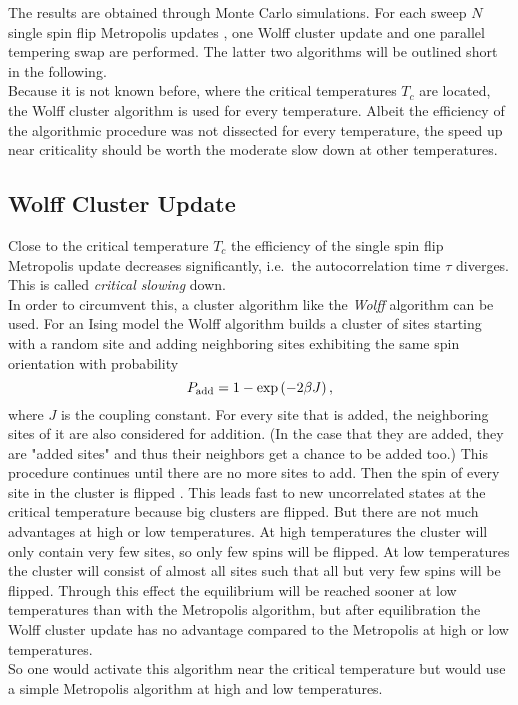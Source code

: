 The results are obtained through Monte Carlo simulations.
For each sweep \(N\) single spin flip Metropolis updates \cite{Metropolis1953}, one
Wolff cluster update \cite{Wolff1989} and one parallel tempering swap \cite{ParallelTempering1986} are
performed. The latter two algorithms will be outlined short in the following.\\
Because it is not known before, where the critical temperatures
\(T_c\) are located, the Wolff cluster algorithm is used for
every temperature. Albeit the efficiency of the algorithmic procedure
was not dissected for every temperature, the speed up
near criticality should be worth the moderate slow down at other temperatures.

\subsection{Wolff Cluster Update}
\label{sssec:wolff}
    Close to the critical temperature \(T_c\) the efficiency of the
    single spin flip Metropolis update decreases significantly, i.e.\ the
    autocorrelation time \(\tau\) diverges.
    This is called \emph{critical slowing} down.\\
    In order to circumvent this, a cluster algorithm like the \emph{Wolff}
    algorithm \cite{Wolff1989} can be used.
    For an Ising model the Wolff algorithm builds a cluster of sites
    starting with a random site and adding neighboring sites exhibiting the
    same spin orientation with probability
    \begin{equation}
        P_{\mathrm{add}} = 1-\exp\left(-2\beta J\right),
        \label{eq:wolffAdd}
    \end{equation}
    where \(J\) is the coupling constant.
    For every site that is added, the neighboring sites of it are
    also considered for addition. (In the case that they are added,
    they are "added sites" and thus their neighbors get a chance to be
    added too.)
    This procedure continues until there are no more sites to add.
    Then the spin of every site in the cluster is flipped
    \cite[p. 91ff]{NewmanBarkema1999} \cite[p. 151f]{Katzgraber2011}.
    This leads fast to new uncorrelated states at the critical
    temperature because big clusters are flipped. But there are not
    much advantages at high or low temperatures. At high temperatures the cluster
    will only contain very few sites, so only few spins will be flipped.
    At low temperatures the cluster will consist of almost all sites
    such that all but very few spins will be flipped. Through this effect the equilibrium
    will be reached sooner at low temperatures than with the Metropolis
    algorithm, but after equilibration the Wolff cluster update has no
    advantage compared to the Metropolis at high or low temperatures.\\
    So one would activate this algorithm near the critical temperature
    but would use a simple Metropolis algorithm at high and low temperatures.

